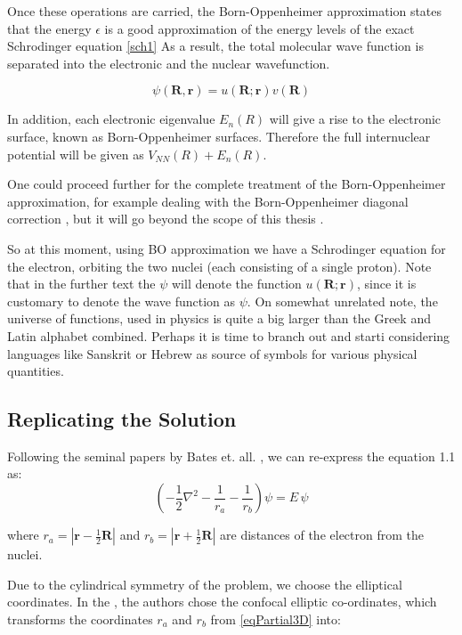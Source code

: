 Once these operations are carried, the Born-Oppenheimer approximation states that the energy $ \epsilon $ is a good approximation of the energy levels of the exact Schrodinger equation \eqref{sch1}
 As a result, the total molecular wave function is separated into the electronic and the nuclear wavefunction.

\begin{equation}
\psi(\mathbf{R},\mathbf{r}) =  u(\mathbf{R};\mathbf{r})  v( \mathbf{R} )
\end{equation}

In addition, each electronic eigenvalue $ E_n(R) $ will give a rise to the electronic surface, known as Born-Oppenheimer surfaces. Therefore the full internuclear potential will be given as $ V_{NN}(R) + E_n(R) $. 

One could proceed further for the complete treatment of the Born-Oppenheimer approximation, for example dealing with the Born-Oppenheimer diagonal correction \cite{BOApprox2}, but it will go beyond the scope of this thesis . 

So at this moment, using BO approximation we have a Schrodinger equation for the electron, orbiting the two nuclei (each consisting of a single proton). Note that in the further text the $ \psi $ will denote the function $  u(\mathbf{R}; \mathbf{r} ) $, since it is customary to denote the wave function as $ \psi $. On somewhat unrelated note, the universe of functions,  used in physics is quite a big larger than the Greek and Latin alphabet combined. Perhaps it is time to branch out and starti considering languages like Sanskrit or Hebrew as source of symbols for various physical quantities.

\subsection{Replicating the Solution}

Following the seminal papers by Bates et. all.  \cite{Bates1}\cite{Bates2}, we can re-express the equation 1.1 as:
\begin{equation}\label{eqPartial3D}
\left(-\frac{1}{2}\nabla^2-\frac{1}{r_a}-\frac{1}{r_b}\right)\psi = E\,\psi
\end{equation}

where $ r_a = \left|\mathbf{r}-\frac{1}{2}\mathbf{R}\right| $ and $ r_b = \left|\mathbf{r}+\frac{1}{2}\mathbf{R}\right| $ are distances of the electron from the nuclei.

Due to the cylindrical symmetry of the problem, we choose the elliptical coordinates. In the \cite{Bates1}, the authors chose the confocal elliptic co-ordinates, which transforms the coordinates $ r_a $ and $ r_ b $ from \eqref {eqPartial3D} into:

